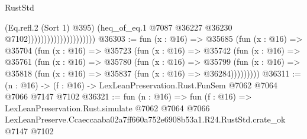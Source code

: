 \begin{lexlean}{RustStd}
\begin{coremodule}
                                            (Eq.refl.{2} (Sort 1) @395)
                                            (heq_of_eq.{1}
                                              @7087
                                              @36227
                                              @36230
                                              @7102)))))))))))))))))))))
@36303 := fun (x : @16) =>
  @35685
    (fun (x : @16) =>
    @35704
      (fun (x : @16) =>
      @35723
        (fun (x : @16) =>
        @35742
          (fun (x : @16) =>
          @35761
            (fun (x : @16) =>
            @35780
              (fun (x : @16) =>
              @35799
                (fun (x : @16) => @35818 (fun (x : @16) => @35837 (fun (x : @16) => @36284)))))))))
@36311 := (n : @16) -> (f : @16) -> LexLeanPreservation.Rust.FunSem @7062 @7064 @7066 @7147 @7102
@36321 := fun (n : @16) =>
  fun (f : @16) =>
  LexLeanPreservation.Rust.simulate
    @7062
    @7064
    @7066
    LexLeanPreserve.Ccaeccaaba02a7ff660a752e6908b53a1.R24.RustStd.crate_ok
    @7147
    @7102
\end{coremodule}
\end{lexlean}
